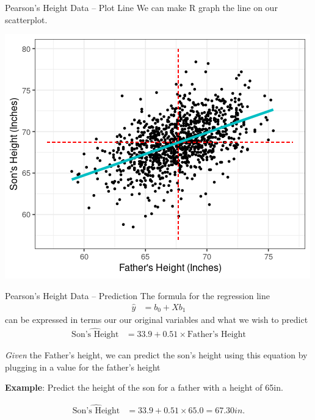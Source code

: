 \documentclass{beamer}
\begin{document}
\begin{frame}{Pearson's Height Data -- Plot Line}
We can make R graph the line on our scatterplot.
\begin{center}
\includegraphics[scale=.5]{img/father_son_lm.png}
\end{center}
\end{frame}

\begin{frame}{Pearson's Height Data -- Prediction}
\footnotesize
The formula for the regression line
\begin{align*}
\hat{y} &= b_0 + X b_1
\end{align*}
can be expressed in terms our our original variables and what we wish to predict
\begin{align*}
\widehat{\text{Son's Height}} &= 33.9 + 0.51 \times \text{Father's Height}
\end{align*} \vspace{6mm}

\textit{Given} the Father's height, we can predict the son's height using this equation by plugging in a value for the father's height \vspace{3mm}

\textbf{Example}: Predict the height of the son for a father with a height of 65in. \vspace{3mm}

\begin{align*}
\widehat{\text{Son's Height}} &= 33.9 + 0.51 \times 65.0 = 67.30in.
\end{align*}

\end{frame}
\end{document}
